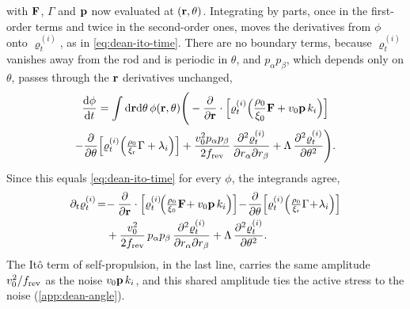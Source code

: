 \documentclass[aps,pre,reprint,superscriptaddress,longbibliography,nofootinbib
]{revtex4-2}
\begin{document}
with $\mathbf{F}$, $\Gamma$ and $\mathbf{p}$ now evaluated at
$(\mathbf{r},\theta)$. Integrating by parts, once in the
first-order terms and twice in the second-order ones, moves
the derivatives from $\phi$ onto $\varrho^{(i)}_t$, as in
\cref{eq:dean-ito-time}. There are no boundary terms,
because $\varrho^{(i)}_t$ vanishes away from the rod and is
periodic in $\theta$, and $p_\alpha p_\beta$, which depends
only on $\theta$, passes through the $\mathbf{r}$ derivatives
unchanged,
\begin{multline}
  \frac{\mathrm{d}\phi}{\mathrm{d} t} =
  \int\mathrm{d}\mathbf{r}\mathrm{d}\theta\, \phi(\mathbf{r},\theta) \Bigg(
    -\frac{\partial }{\partial \mathbf{r}}\cdot\Bigl[\varrho^{(i)}_t
    \Bigl(\frac{\rho_0}{\xi_0}\mathbf{F}+v_0\mathbf{p}\,k_i\Bigr)\Bigr]
  \\
  - \frac{\partial }{\partial \theta}\Bigl[\varrho^{(i)}_t\Bigl(\tfrac{\rho_0}{\xi_{\rm r}}\Gamma+\lambda_i\Bigr)\Bigr]
  + \frac{v_0^2 p_\alpha p_\beta}{2f_{\rm rev}}\,
    \frac{\partial ^2\varrho^{(i)}_t}{\partial r_\alpha\partial r_\beta}
  + \Lambda\,\frac{\partial ^2\varrho^{(i)}_t}{\partial \theta^2}
\Bigg).
\end{multline}
Since this equals \cref{eq:dean-ito-time} for every $\phi$,
the integrands agree,
\begin{align}
  \label{eq:dean-single}
  \partial_t\varrho^{(i)}_t \!=&\!  -\pd{}{\r}\cdot\Bigl[\varrho^{(i)}_t
    \!\Bigl(\tfrac{\rho_0}{\xi_0}\F\!+v_0\p\,k_i\Bigr)\Bigr]
 \!-\! \pd{}{\theta}\Bigl[\varrho^{(i)}_t\Bigl(\tfrac{\rho_0}{\xir}\Gamma\!+\!\lambda_i\Bigr)\Bigr]
  \nonumber\\
  &+ \frac{v_0^2}{2\frev}\,p_\alpha p_\beta\,
    \pd{^2\varrho^{(i)}_t}{r_\alpha\partial r_\beta}
  + \Lambda\,\pd{^2\varrho^{(i)}_t}{\theta^2}.
\end{align}
The It\^o term of self-propulsion, in the last line,
carries the same amplitude $v_0^2/f_{\rm rev}$ as the noise
$v_0\mathbf{p}\,k_i$, and this shared amplitude ties the active
stress to the noise (\cref{app:dean-angle}).
\end{document}
